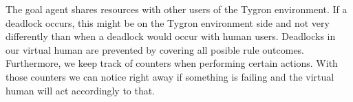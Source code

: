 The goal agent shares resources with other users of the Tygron environment. If a deadlock occurs, this might be on the Tygron environment side and not very differently than when a deadlock would occur with human users. Deadlocks in our virtual human are prevented by covering all posible rule outcomes. Furthermore, we keep track of counters when performing certain actions. With those counters we can notice right away if something is failing and the virtual human will act accordingly to that. 
\newpage
